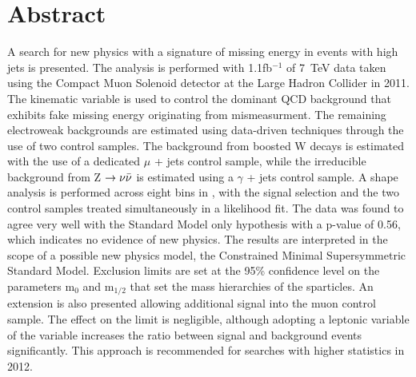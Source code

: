 \chapter*{Abstract}
\noindent 
\vspace{10mm}
\normalsize

A search for new physics with a signature of missing energy in events with high \Pt jets is presented. The analysis is performed with 1.1fb$^{-1}$ of 7~TeV data taken using the Compact Muon Solenoid detector at the Large Hadron Collider in 2011. The kinematic variable \alt is used to control the dominant QCD background that exhibits fake missing energy originating from mismeasurment. The remaining electroweak backgrounds are estimated using data-driven techniques through the use of two control samples. The background from boosted W decays is estimated with the use of a dedicated $\mu$ + jets control sample, while the irreducible background from Z $\rightarrow \nu \bar{\nu}$ is estimated using a $\gamma$ + jets control sample.  A shape analysis is performed across eight bins in \HT, with the signal selection and the two control samples treated simultaneously in a likelihood fit.  The data was found to agree very well with the Standard Model only hypothesis with a p-value of 0.56, which indicates no evidence of new physics. The results are interpreted in the scope of a possible new physics model, the Constrained Minimal Supersymmetric Standard Model. Exclusion limits are set at the 95\% confidence level on the parameters m$_{0}$ and m$_{1/2}$ that set the mass hierarchies of the sparticles. An extension is also presented allowing additional signal into the muon control sample. The effect on the limit is negligible, although adopting a leptonic variable of the \alt variable increases the ratio between signal and background events significantly. This approach is recommended for searches with higher statistics in 2012. 



